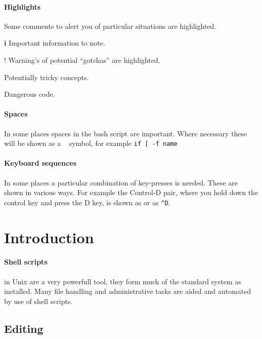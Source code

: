 \documentclass[12pt,a4paper]{article}
\begin{document}
\paragraph{Highlights}
Some comments to alert you of particular situations are highlighted.
\begin{note}{\Large\textbf{i}}
        Important information to note.
\end{note}

\begin{note}{\Large !}
        Warning's of potential ``gotchas'' are
highlighted.
\end{note}

\begin{note}{\scriptsize\dbend}
        Potentially tricky concepts.
\end{note}

\begin{note}{\small\faWarning}
        Dangerous code.
\end{note}

\paragraph{Spaces} In some places spaces in the bash script are important.
Where necessary these will be shown as a \verb*| | symbol, for example
\verb*'if [ -f name'

\paragraph{Keyboard sequences} In some places a particular combination of
key-presses is needed.  These are shown in various ways.  For example the
Control-D pair, where you hold down the control key and press the D key, is
shown as  or as \verb'^D'.

\section{Introduction}
\paragraph{Shell scripts} in Unix are a very powerfull tool, they
form much of the standard system as installed.  Many file handling and
administrative tasks are aided and automated by use of shell scripts.

\subsection{Editing}
\end{document}
